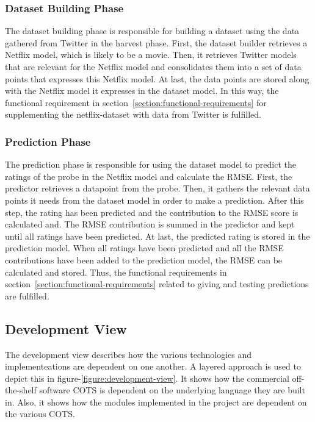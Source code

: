 \subsubsection{Dataset Building Phase}
The dataset building phase is responsible for building a dataset using the data gathered from Twitter in the harvest phase. First, the dataset builder retrieves a Netflix model, which is likely to be a movie. Then, it retrieves Twitter models that are relevant for the Netflix model and consolidates them into a set of data points that expresses this Netflix model. At last, the data points are stored along with the Netflix model it expresses in the dataset model. In this way, the functional requirement in section~\ref{section:functional-requirements} for supplementing the netflix-dataset with data from Twitter is fulfilled.

\subsubsection{Prediction Phase}\label{subsubsec:predict-phase}
The prediction phase is responsible for using the dataset model to predict the ratings of the probe in the Netflix model and calculate the RMSE. First, the predictor retrieves a datapoint from the probe. Then, it gathers the relevant data points it needs from the dataset model in order to make a prediction. After this step, the rating has been predicted and the contribution to the RMSE score is calculated and. The RMSE contribution is summed in the predictor and kept until all ratings have been predicted. At last, the predicted rating is stored in the prediction model. When all ratings have been predicted and all the RMSE contributions have been added to the prediction model, the RMSE can be calculated and stored. Thus, the functional requirements in section~\ref{section:functional-requirements} related to giving and testing predictions are fulfilled.

\subsection{Development View}
The development view describes how the various technologies and implementeations are dependent on one another. A layered approach is used to depict this in figure-\ref{figure:development-view}. It shows how the commercial off-the-shelf software COTS is dependent on the underlying language they are built in. Also, it shows how the modules implemented in the project are dependent on the various COTS.

